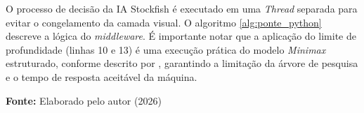 O processo de decisão da IA Stockfish é executado em uma \textit{Thread} separada para evitar o congelamento da camada visual. O algoritmo \ref{alg:ponte_python} descreve a lógica do \textit{middleware}. É importante notar que a aplicação do limite de profundidade (linhas 10 e 13) é uma execução prática do modelo \textit{Minimax} estruturado, conforme descrito por , garantindo a limitação da árvore de pesquisa e o tempo de resposta aceitável da máquina.

\begin{algorithm}[H]
	\caption{Lógica de Processamento de Movimento da IA Stockfish.}
	\label{alg:ponte_python}
\end{algorithm}
\begin{center}
	\vspace{-0.2cm} %
	\small \textbf{Fonte:} Elaborado pelo autor (2026)
\end{center}